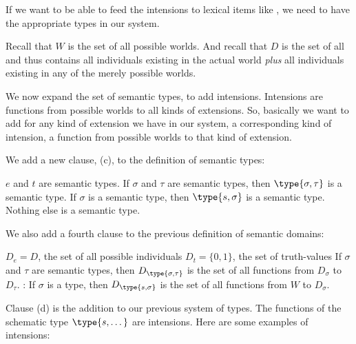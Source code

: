 If we want to be able to feed the intensions to lexical items like
, we need to have the appropriate
types in our system.

Recall that $W$ is the set of all possible worlds. And recall that $D$ is the
set of all  and thus contains all individuals
existing in the actual world \emph{plus} all individuals existing in any of the
merely possible worlds.

We now expand the set of semantic types, to add intensions. Intensions are
functions from possible worlds to all kinds of extensions. So, basically we want
to add for any kind of extension we have in our system, a corresponding kind of
intension, a function from possible worlds to that kind of extension.

We add a new clause, (\nextx c), to the definition of semantic types:

\pex {}
\a $e$ and $t$ are semantic types.
\a If $\sigma$ and $\tau$ are semantic types, then $\type{\sigma,\tau}$ is a
semantic type.
\a If $\sigma$ is a semantic type, then $\type{s,\sigma}$ is a semantic type.
\a Nothing else is a semantic type.
\xe

\kwn
We also add a fourth clause to the previous definition of semantic domains:

\pex {}
\a $D_{e} = D$, the set of all possible
individuals
\a $D_{t} = \{0,1\}$, the set of truth-values
\a If $\sigma$ and
$\tau$ are semantic types, then $D_{\type{\sigma,\tau}}$ is the set of all
functions from $D_{\sigma}$ to $D_{\tau}$.
\a {}: If $\sigma$ is
a type, then $D_{\type{s,\sigma}}$ is the set of all functions from $W$ to
$D_{\sigma}$.
\xe

%
Clause (d) is the addition to our previous system of types. The functions of the
schematic type $\type{s,\dots}$ are intensions. Here are some examples of
intensions:

